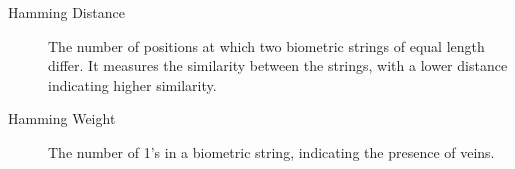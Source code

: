 \begin{description}
    \item[Hamming Distance] \label{def:Hamming Distance} The number of positions at which two biometric strings of equal length differ. It measures the similarity between the strings, with a lower distance indicating higher similarity.

    \item[Hamming Weight] \label{def:Hamming Weight} The number of 1's in a biometric string, indicating the presence of veins.

\end{description}
